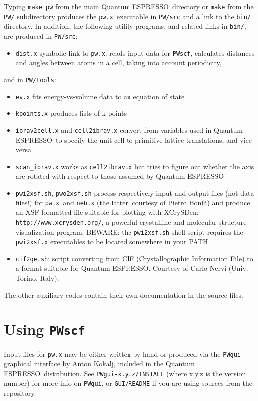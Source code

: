 \documentclass[12pt,a4paper]{article}
\def\PWscf{\texttt{PWscf}}
\def\qe{{\sc Quantum ESPRESSO}}
\def\pwx{\texttt{pw.x}}
\begin{document}
Typing \texttt{make pw} from the main \qe\ directory or
\texttt{make} from the \texttt{PW/} subdirectory produces
the \pwx\ executable in \texttt{PW/src} and a link to the
\texttt{bin/} directory. In addition, the following utility
programs, and related links in \texttt{bin/}, are produced
in \texttt{PW/src}:
\begin{itemize}
\item  \texttt{dist.x} symbolic link to \pwx: reads input data for \PWscf,
calculates distances and angles between atoms in a cell,
taking into account periodicity,
\end{itemize}
and in \texttt{PW/tools}:
\begin{itemize}
\item  \texttt{ev.x} fits energy-vs-volume data to an equation of state
\item  \texttt{kpoints.x} produces lists of k-points
\item  \texttt{ibrav2cell.x} and \texttt{cell2ibrav.x} convert from
  variables used in \qe\ to specify the unit cell to primitive
  lattice translations, and vice versa\
\item  \texttt{scan\_ibrav.x} works as \texttt{cell2ibrav.x} but tries
  to figure out whether the axis are rotated with respect to those
  assumed by \qe
\item  \texttt{pwi2xsf.sh},  \texttt{pwo2xsf.sh} process respectively 
  input and output files (not data files!) for \pwx\ and \texttt{neb.x} 
  (the latter, courtesy of Pietro Bonf\`a) and produce an XSF-formatted file
  suitable for plotting with XCrySDen:
  \texttt{http://www.xcrysden.org/}, a powerful crystalline and
  molecular structure visualization program.
  BEWARE: the  \texttt{pwi2xsf.sh} shell script requires the
  \texttt{pwi2xsf.x} executables to be located somewhere in your PATH. 
\item  \texttt{cif2qe.sh}: script converting from CIF 
  (Crystallographic Information File) to a format suitable for \qe.
  Courtesy of Carlo Nervi (Univ. Torino, Italy).
\end{itemize}
The other auxiliary codes contain their own documentation in the source
files.

\newpage\section{Using \PWscf}

Input files for \texttt{pw.x} may be either written by hand 
or produced via the \texttt{PWgui} graphical interface by Anton Kokalj, 
included in the \qe\ distribution. See \texttt{PWgui-x.y.z/INSTALL}
(where x.y.z is the version number) for more info on \texttt{PWgui}, 
or \texttt{GUI/README} if you are using sources from the repository.
\end{document}
